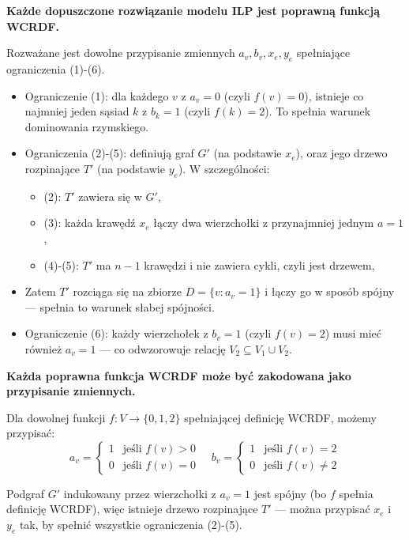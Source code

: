 \textbf{Każde dopuszczone rozwiązanie modelu ILP jest poprawną funkcją WCRDF.}

Rozważane jest dowolne przypisanie zmiennych $a_v, b_v, x_e, y_e$ spełniające ograniczenia (1)-(6).

\begin{itemize}
    \item Ograniczenie (1): dla każdego $v$ z $a_v = 0$ (czyli $f(v) = 0$), istnieje co najmniej jeden sąsiad $k$ z $b_k = 1$ (czyli $f(k) = 2$). To spełnia warunek dominowania rzymskiego.
    
    \item Ograniczenia (2)-(5): definiują graf $G'$ (na podstawie $x_e$), oraz jego drzewo rozpinające $T'$ (na podstawie $y_e$). W szczególności:
    \begin{itemize}
        \item (2): $T'$ zawiera się w $G'$,
        \item (3): każda krawędź $x_e$ łączy dwa wierzchołki z przynajmniej jednym $a = 1$,
        \item (4)-(5): $T'$ ma $n-1$ krawędzi i nie zawiera cykli, czyli jest drzewem,
    \end{itemize}
    \item Zatem $T'$ rozciąga się na zbiorze $D = \{v : a_v = 1\}$ i łączy go w sposób spójny — spełnia to warunek słabej spójności.
    
    \item Ograniczenie (6): każdy wierzchołek z $b_v = 1$ (czyli $f(v) = 2$) musi mieć również $a_v = 1$ — co odwzorowuje relację $V_2 \subseteq V_1 \cup V_2$.
\end{itemize}

\textbf{Każda poprawna funkcja WCRDF może być zakodowana jako przypisanie zmiennych.}

Dla dowolnej funkcji $f : V \to \{0,1,2\}$ spełniającej definicję WCRDF, możemy przypisać:
\[
a_v = \begin{cases}
1 & \text{jeśli } f(v) > 0 \\
0 & \text{jeśli } f(v) = 0
\end{cases}
\quad
b_v = \begin{cases}
1 & \text{jeśli } f(v) = 2 \\
0 & \text{jeśli } f(v) \ne 2
\end{cases}
\]

Podgraf $G'$ indukowany przez wierzchołki z $a_v = 1$ jest spójny (bo $f$ spełnia definicję WCRDF), więc istnieje drzewo rozpinające $T'$ — można przypisać $x_e$ i $y_e$ tak, by spełnić wszystkie ograniczenia (2)-(5).

